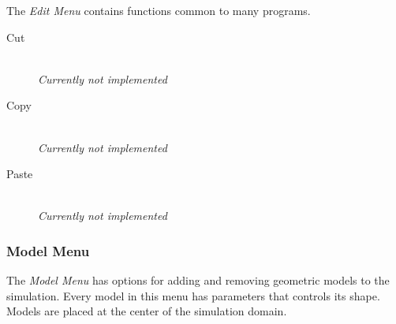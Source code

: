 \documentclass[11pt,titlepage]{article}
\begin{document}
The \emph{Edit Menu} contains functions common to many programs.

\begin{description}

  \item[Cut] \hfill \\
  \emph{Currently not implemented}
  
  \item[Copy] \hfill \\
  \emph{Currently not implemented}
  
  \item[Paste] \hfill \\
  \emph{Currently not implemented}

\end{description}

\subsubsection{Model Menu}

The \emph{Model Menu} has options for adding and removing geometric models to the simulation. Every model in this menu has parameters that controls its shape. Models are placed at the center of the simulation domain.
\end{document}
